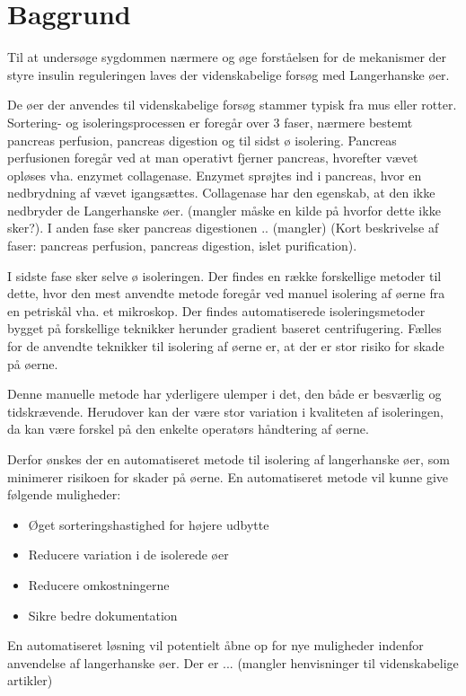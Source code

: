 \section{Baggrund}
Til at undersøge sygdommen nærmere og øge forståelsen for de mekanismer der styre insulin reguleringen laves der videnskabelige forsøg med Langerhanske øer.

De øer der anvendes til videnskabelige forsøg stammer typisk fra mus eller rotter. Sortering- og isoleringsprocessen er foregår over 3 faser, nærmere bestemt pancreas perfusion, pancreas digestion og til sidst ø isolering. Pancreas perfusionen foregår ved at man operativt fjerner pancreas, hvorefter vævet opløses vha. enzymet collagenase. Enzymet sprøjtes ind i pancreas, hvor en nedbrydning af vævet igangsættes. Collagenase har den egenskab, at den ikke nedbryder de Langerhanske øer. (mangler måske en kilde på hvorfor dette ikke sker?). I anden fase sker pancreas digestionen .. (mangler)  (Kort beskrivelse af faser: pancreas perfusion, pancreas digestion, islet purification).

I sidste fase sker selve ø isoleringen. Der findes en række forskellige metoder til dette, hvor den mest anvendte metode foregår ved manuel isolering af øerne fra en petriskål vha. et mikroskop. Der findes automatiserede isoleringsmetoder bygget på forskellige teknikker herunder gradient baseret centrifugering. Fælles for de anvendte teknikker til  isolering af øerne er, at der er stor risiko for skade på øerne.

Denne manuelle metode har yderligere ulemper i det, den både er besværlig og tidskrævende. Herudover kan der være stor variation i kvaliteten af isoleringen, da kan være forskel på den enkelte operatørs håndtering af øerne. 

Derfor ønskes der en automatiseret metode til isolering af langerhanske øer, som minimerer risikoen for skader på øerne. En automatiseret metode vil kunne give følgende muligheder: 

\begin{itemize}
\item Øget sorteringshastighed for højere udbytte
\item Reducere variation i de isolerede øer
\item Reducere omkostningerne
\item Sikre bedre dokumentation
\end{itemize} 

En automatiseret løsning vil potentielt åbne op for nye muligheder indenfor anvendelse af langerhanske øer. Der er ... (mangler henvisninger til videnskabelige artikler)

